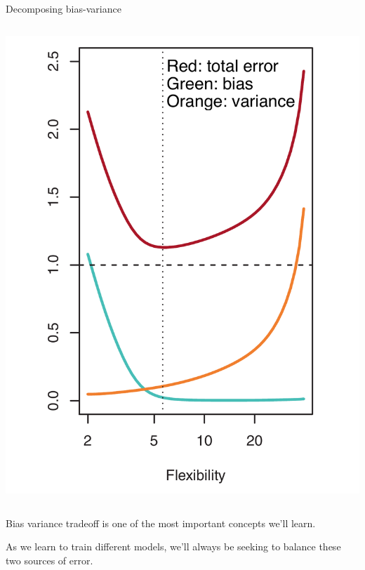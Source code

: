 \documentclass[aspectratio=169, handout]{beamer}
\begin{document}
\begin{frame}{Decomposing bias-variance}
\begin{columns}
\pause 
\includegraphics[scale=0.21]{figures/islr2_12a_text.pdf}

\end{columns}

\end{frame}


\begin{frame}{Bias variance tradeoff is one of the most important concepts we'll learn.}
    
As we learn to train different models, we'll always be seeking to balance these two sources of error.

\end{frame}
\end{document}
